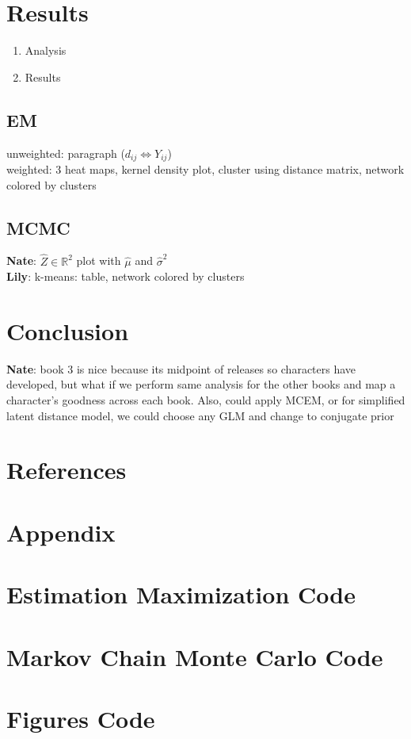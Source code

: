 \documentclass{article}
\begin{document}
\section{Results} \label{Results}
\begin{enumerate}
    \item Analysis
    \item Results
\end{enumerate}

\subsection{EM}

unweighted: paragraph ($d_{ij} \iff Y_{ij}$)\\

weighted: 3 heat maps, kernel density plot, cluster using distance matrix, network colored by clusters

\subsection{MCMC}

\textbf{Nate}: $\hat{Z} \in \mathbb{R}^2$ plot with $\hat{\mu}$ and $\hat{\sigma}^2$\\

\textbf{Lily}: k-means: table, network colored by clusters

\section{Conclusion} \label{Conclusion}

\textbf{Nate}: book 3 is nice because its midpoint of releases so characters have developed, but what if we perform same analysis for the other books and map a character's goodness across each book. Also, could apply MCEM, or for simplified latent distance model, we could choose any GLM and change to conjugate prior

\section{References}
\printbibliography

\section*{Appendix}
\appendix 

\section{Estimation Maximization Code}
\section{Markov Chain Monte Carlo Code}
\section{Figures Code}
\end{document}
